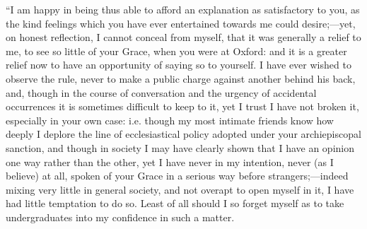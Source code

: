 ``I am happy in being thus able to afford an
explanation as satisfactory to you, as the kind feelings which you have
ever entertained towards me could desire;—yet, on honest reflection, I
cannot conceal from myself, that it was generally a relief to me, to see
so little of your Grace, when you were at Oxford: and it is a greater
relief now to have an opportunity of saying so to yourself. I have ever
wished to observe the rule, never to make a public charge against
another behind his back, and, though in the course of conversation and
the urgency of accidental occurrences it is sometimes difficult to keep
to it, yet I trust I have not broken it, especially in your own case:
i.e. though my most intimate friends know how deeply I deplore the line
of ecclesiastical policy adopted under your archiepiscopal sanction, and
though in society I may have clearly shown that I have an opinion one
way rather than the other, yet I have never in my intention, never (as I
believe) at all, spoken of your Grace in a serious way before
strangers;—indeed mixing very little in general society, and not
overapt to open myself in it, I have had little temptation to do so.
Least of all should I so forget myself as to take undergraduates into my
confidence in such a matter.

